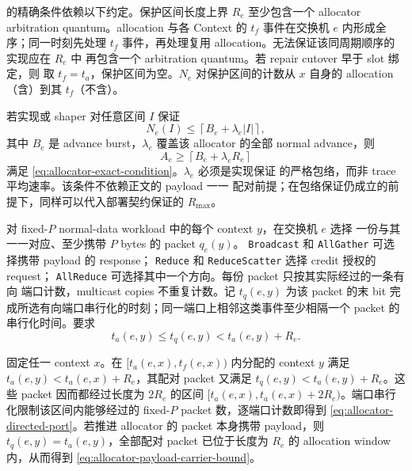  的精确条件依赖以下约定。保护区间长度上界
$R_e$ 至少包含一个 allocator arbitration quantum。allocation 与各
Context 的 $t_f$ 事件在交换机 $e$ 内形成全序；同一时刻先处理 $t_f$
事件，再处理复用 allocation。无法保证该同周期顺序的实现应在 $R_e$ 中
再包含一个 arbitration quantum。若 repair cutover 早于 slot 绑定，则
取 $t_f=t_a$，保护区间为空。$N_e$ 对保护区间的计数从 $x$ 自身的
allocation（含）到其 $t_f$（不含）。

若实现或 shaper 对任意区间 $I$ 保证
\begin{equation}
 N_e(I)\leq\left\lceil B_e+\lambda_e|I|\right\rceil ,
 \label{eq:allocator-arrival-envelope}
\end{equation}
其中 $B_e$ 是 advance burst，$\lambda_e$ 覆盖该 allocator 的全部
normal advance，则
\begin{equation}
 A_e\geq\left\lceil B_e+\lambda_eR_e\right\rceil
 \label{eq:allocator-depth-envelope}
\end{equation}
满足 \cref{eq:allocator-exact-condition}。$\lambda_e$ 必须是实现保证
的严格包络，而非 trace 平均速率。该条件不依赖正文的 payload 一一
配对前提；在包络保证仍成立的前提下，同样可以代入部署契约保证的
$R_{\max}$。

对 fixed-$P$ normal-data workload 中的每个 context $y$，在交换机 $e$ 选择
一份与其一一对应、至少携带 $P$ bytes 的 packet $q_e(y)$。
\texttt{Broadcast} 和 \texttt{AllGather} 可选择携带 payload 的 response；
\texttt{Reduce} 和 \texttt{ReduceScatter} 选择 credit 授权的 request；
\texttt{AllReduce} 可选择其中一个方向。每份 packet 只按其实际经过的一条有向
端口计数，multicast copies 不重复计数。记 $t_q(e,y)$ 为该 packet 的末 bit
完成所选有向端口串行化的时刻；同一端口上相邻这类事件至少相隔一个 packet 的
串行化时间。要求
\begin{equation}
 t_a(e,y)\leq t_q(e,y)<t_a(e,y)+R_e.
 \label{eq:allocator-payload-witness}
\end{equation}

固定任一 context $x$。在 $[t_a(e,x),t_f(e,x))$ 内分配的 context $y$ 满足
$t_a(e,y)<t_a(e,x)+R_e$，其配对 packet 又满足
$t_q(e,y)<t_a(e,y)+R_e$。这些 packet 因而都经过长度为 $2R_e$ 的区间
$[t_a(e,x),t_a(e,x)+2R_e)$。端口串行化限制该区间内能够经过的 fixed-$P$
packet 数，逐端口计数即得到 \cref{eq:allocator-directed-port}。若推进
allocator 的 packet 本身携带 payload，则 $t_q(e,y)=t_a(e,y)$，全部配对
packet 已位于长度为 $R_e$ 的 allocation window 内，从而得到
\cref{eq:allocator-payload-carrier-bound}。

